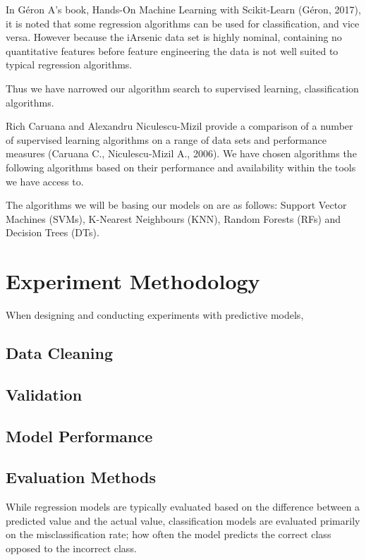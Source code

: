 In Géron A's book, Hands-On Machine Learning with Scikit-Learn (Géron, 2017), it is noted that some regression algorithms can be used for classification, and vice versa. However because the iArsenic data set is highly nominal, containing no quantitative features before feature engineering the data is not well suited to typical regression algorithms.

Thus we have narrowed our algorithm search to supervised learning, classification algorithms.

Rich Caruana and Alexandru Niculescu-Mizil provide a comparison of a number of supervised learning algorithms on a range of data sets and performance measures (Caruana C., Niculescu-Mizil A., 2006). We have chosen algorithms the following algorithms based on their performance and availability within the tools we have access to.

The algorithms we will be basing our models on are as follows: Support Vector Machines (SVMs), K-Nearest Neighbours (KNN), Random Forests (RFs) and Decision Trees (DTs).

\section{Experiment Methodology}

When designing and conducting experiments with predictive models, 

\subsection{Data Cleaning}

\subsection{Validation}

\subsection{Model Performance}

\subsection{Evaluation Methods}

While regression models are typically evaluated based on the difference between a predicted value and the actual value, classification models are evaluated primarily on the misclassification rate; how often the model predicts the correct class opposed to the incorrect class.

